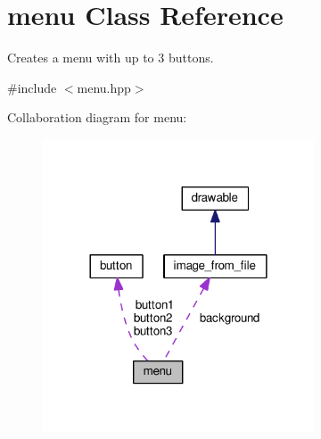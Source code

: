 \hypertarget{classmenu}{}\section{menu Class Reference}
\label{classmenu}


Creates a menu with up to 3 buttons.  




{\ttfamily \#include $<$menu.\+hpp$>$}



Collaboration diagram for menu\+:\nopagebreak
\begin{figure}[H]
\begin{center}
\leavevmode
\includegraphics[width=228pt]{classmenu__coll__graph}
\end{center}
\end{figure}
